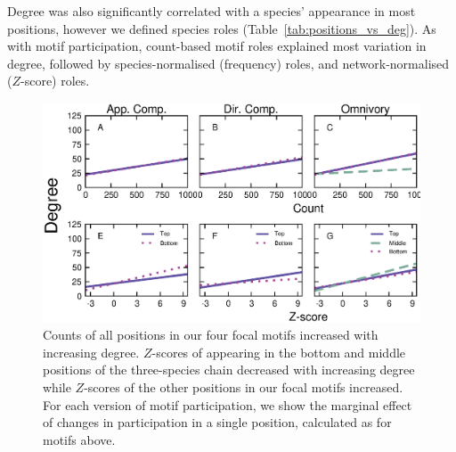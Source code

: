 \documentclass[12pt]{article}
\begin{document}
            Degree was also significantly correlated with a species' appearance in most positions, however we defined species roles (Table~\ref{tab:positions_vs_deg}).
            As with motif participation, count-based motif roles explained most variation in degree, followed by species-normalised (frequency) roles, and network-normalised ($Z$-score) roles.


		    \begin{figure}[ht!]
		        \centering
		        \includegraphics[width=\textwidth]{figures/positions_vs_Deg_countZ.eps}
		        \caption{Counts of all positions in our four focal motifs increased with increasing degree. $Z$-scores of appearing in the bottom and middle positions of the three-species chain decreased with increasing degree while $Z$-scores of the other positions in our focal motifs increased. For each version of motif participation, we show the marginal effect of changes in participation in a single position, calculated as for motifs above.}
		        \label{fig:positions_deg}
		    \end{figure}
\end{document}
